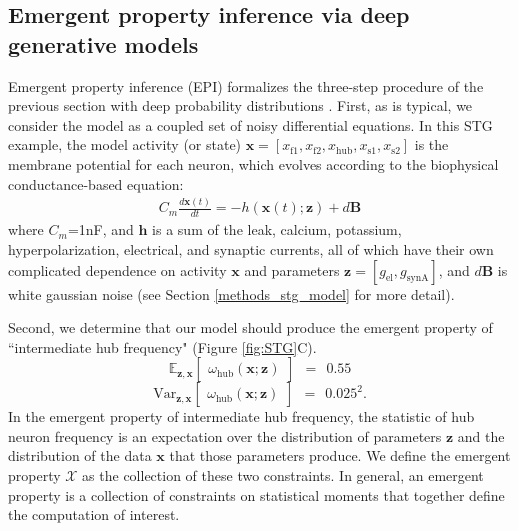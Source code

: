 \documentclass[11pt]{article}
\begin{document}
\subsection{Emergent property inference via deep generative models} \label{results_dgm}
Emergent property inference (EPI) formalizes the three-step procedure of the previous section with deep probability distributions \cite{rezende2015variational, papamakarios2019normalizing}.
First, as is typical, we consider the model as a coupled set of noisy differential equations.  
In this STG example, the model activity (or state) $\mathbf{x} = \left[ x_{\text{f1}}, x_{\text{f2}}, x_{\text{hub}}, x_{\text{s1}}, x_{\text{s2}} \right]$ is the membrane potential for each neuron, which evolves according to the biophysical conductance-based equation:
\begin{equation} \label{eq:STG_model1}
\begin{split}
C_m \frac{d\mathbf{x}(t)}{dt} = -h(\mathbf{x}(t); \mathbf{z}) + d\mathbf{B}
 \end{split}
\end{equation} 
where $C_m$=1nF, and $\mathbf{h}$ is a sum of the leak, calcium, potassium, hyperpolarization, electrical, and synaptic currents, all of which have their own complicated dependence on activity $\mathbf{x}$ and parameters $\mathbf{z} = [g_{\text{el}}, g_{\text{synA}}]$, and $d\mathbf{B}$ is white gaussian noise \cite{gutierrez2013multiple} (see Section \ref{methods_stg_model} for more detail).

Second, we determine that our model should produce the emergent property of ``intermediate hub frequency" (Figure \ref{fig:STG}C).
\begin{equation}\label{eq:EP_STG1}
 \mathbb{E}_{\mathbf{z},\mathbf{x}}\begin{bmatrix} \omega_{\text{hub}}(\mathbf{x}; \mathbf{z}) \end{bmatrix}  ~~=~~  0.55
\end{equation}
\begin{equation}\label{eq:EP_STG2}
\text{Var}_{\mathbf{z},\mathbf{x}}\begin{bmatrix} \omega_{\text{hub}}(\mathbf{x}; \mathbf{z}) \end{bmatrix}  ~~=~~   0.025^2.
\end{equation}
In the emergent property of intermediate hub frequency, the statistic of hub neuron frequency is an expectation over the distribution of parameters $\mathbf{z}$ and the distribution of the data $\mathbf{x}$ that those parameters produce.
We define the emergent property $\mathcal{X}$ as the collection of these two constraints.
In general, an emergent property is a collection of constraints on statistical moments that together define the computation of interest.
\end{document}
